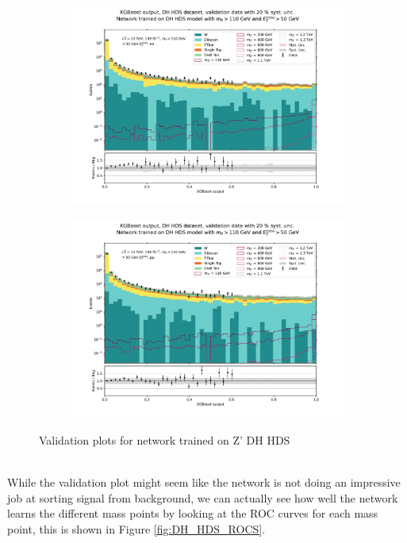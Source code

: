 \documentclass[12pt, a4paper]{book}
\begin{document}
\begin{figure}[!ht]
	\centering
	\begin{subfigure}[b]{0.49\textwidth}
      \centering
      \includegraphics[width=1\textwidth]{XGBoost/DH_HDS/VAL_ee.pdf}
      \end{subfigure}
   \hfill
   \begin{subfigure}[b]{0.49\textwidth}
      \centering
      \includegraphics[width=1\textwidth]{XGBoost/DH_HDS/VAL_uu.pdf}
      \end{subfigure}
   \caption{Validation plots for network trained on Z' DH HDS}\label{fig:DH_HDS_vals}
\end{figure}
\\While the validation plot might seem like the network is not doing an impressive job at sorting signal from background, we can actually see how well the network learns the different mass points by looking at the ROC curves for each mass point, this is shown in Figure \ref{fig:DH_HDS_ROCS}. 
\end{document}
